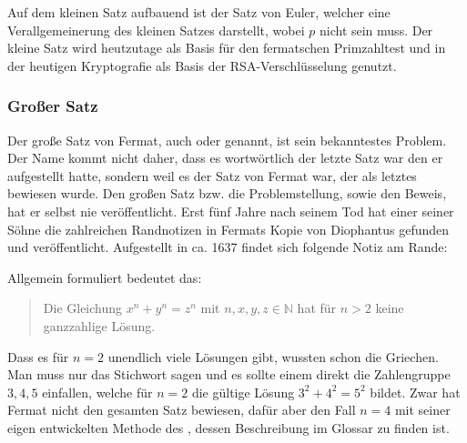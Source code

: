 Auf dem kleinen Satz aufbauend ist der Satz von Euler, welcher eine Verallgemeinerung des kleinen Satzes darstellt, wobei $p$ nicht  sein muss. Der kleine Satz wird heutzutage als Basis für den fermatschen Primzahltest und in der heutigen Kryptografie als Basis der RSA-Verschlüsselung genutzt.

\subsubsection{Großer Satz} \label{sec:grSatz}
Der große Satz von Fermat, auch  oder  genannt, ist sein bekanntestes Problem. Der Name  kommt nicht daher, dass es wortwörtlich der letzte Satz war den er aufgestellt hatte, sondern weil es der Satz von Fermat war, der als letztes bewiesen wurde. Den großen Satz bzw. die Problemstellung, sowie den Beweis, hat er selbst nie veröffentlicht. Erst fünf Jahre nach seinem Tod hat einer seiner Söhne die zahlreichen Randnotizen in Fermats Kopie von Diophantus  gefunden und veröffentlicht. Aufgestellt in ca. 1637 findet sich folgende Notiz am Rande:

\begin{quote}
    \textit{}
\end{quote}

Allgemein formuliert bedeutet das:
\begin{quote}
    Die Gleichung $x^n + y^n = z^n$ mit $n,x,y,z \in \mathbb{N}$ hat für $n>2$ keine ganzzahlige Lösung.
\end{quote}

Dass es für $n = 2$ unendlich viele Lösungen gibt, wussten schon die Griechen. Man muss nur das Stichwort  sagen und es sollte einem direkt die Zahlengruppe $3,4,5$ einfallen, welche für $n = 2$ die gültige Lösung $3^2 + 4^2 = 5^2$ bildet. Zwar hat Fermat nicht den gesamten Satz bewiesen, dafür aber den Fall $n = 4$ mit seiner eigen entwickelten Methode des , dessen Beschreibung im Glossar zu finden ist.

